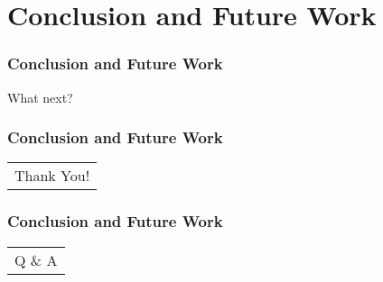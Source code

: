 \section{Conclusion and Future Work}\label{sec:conclusion}

\begin{frame}[c]
  \frametitle{Conclusion and Future Work}
  What next?
\end{frame}

\begin{frame}[c]
  \frametitle{Conclusion and Future Work}
  \begin{center}
    \begin{tabular}[h]{c}
      \Huge  Thank You!
    \end{tabular}
  \end{center}
\end{frame}

\begin{frame}[c]
  \frametitle{Conclusion and Future Work}
  \begin{center}
    \begin{tabular}[h]{c}
      \Huge Q \& A
    \end{tabular}
  \end{center}
\end{frame}